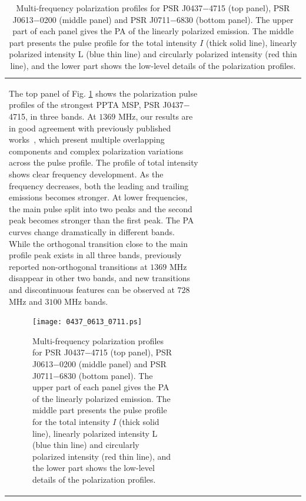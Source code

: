 \documentclass[useAMS,usenatbib]{mn2e}
\begin{document}
\begin{table}
\begin{center}
\begin{tabular}{lcccccccccccc}
The top panel of Fig. \ref{0437p} shows the polarization pulse profiles of the 
strongest PPTA MSP, PSR J0437$-$4715, in three bands.
%
At $1369$ MHz, our results are in good agreement with previously published 
works~\citep{Johnston93,Manchester95_1,Navarro97,Yan11}, which present 
multiple overlapping components and complex polarization variations across 
the pulse profile. 
%
%
The profile of total intensity shows clear frequency development. As the 
frequency decreases, both the leading and trailing emissions becomes stronger.
%
At lower frequencies, the main pulse split into two peaks and the second peak
becomes stronger than the first peak.
%
The PA curves change dramatically in different bands. While the orthogonal 
transition close to the main profile peak exists in all three bands, previously
reported non-orthogonal transitions at $1369$ MHz disappear in other two bands,
and new transitions and discontinuous features can be observed at $728$ MHz 
and $3100$ MHz bands.
%


\begin{figure}
\begin{center}
\texttt{[image: 0437\_0613\_0711.ps]}
\caption{Multi-frequency polarization profiles for PSR J0437$-$4715 (top 
panel), PSR J0613$-$0200 (middle panel) and PSR J0711$-$6830 (bottom panel). 
The upper part of each panel gives the PA of the linearly polarized emission.
The middle part presents the pulse profile for the total intensity $I$ 
(thick solid line), linearly polarized intensity L (blue thin line) and 
circularly polarized intensity (red thin line), and the lower part shows 
the low-level details of the polarization profiles.}
\label{0437p}
\end{center}
\end{figure}


\end{tabular}
\end{center}
\end{table}
\end{document}
